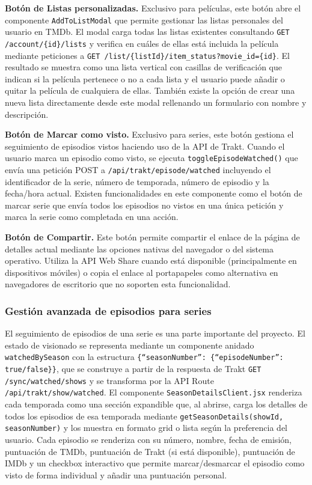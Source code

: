 \textbf{Botón de Listas personalizadas.} Exclusivo para películas, este botón abre el componente \texttt{AddToListModal} que permite gestionar las listas personales del usuario en TMDb. El modal carga todas las listas existentes consultando \texttt{GET /account/\{id\}/lists} y verifica en cuáles de ellas está incluida la película mediante peticiones a \texttt{GET /list/\{listId\}/item\_status?movie\_id=\{id\}}. El resultado se muestra como una lista vertical con casillas de verificación que indican si la película pertenece o no a cada lista y el usuario puede añadir o quitar la película de cualquiera de ellas. También existe la opción de crear una nueva lista directamente desde este modal rellenando un formulario con nombre y descripción.

\textbf{Botón de Marcar como visto.} Exclusivo para series, este botón gestiona el seguimiento de episodios vistos haciendo uso de la API de Trakt. Cuando el usuario marca un episodio como visto, se ejecuta \texttt{toggleEpisodeWatched()} que envía una petición POST a \texttt{/api/trakt/episode/watched} incluyendo el identificador de la serie, número de temporada, número de episodio y la fecha/hora actual. Existen funcionalidades en este componente como el botón de marcar serie que envía todos los episodios no vistos en una única petición y marca la serie como completada en una acción.

\textbf{Botón de Compartir.} Este botón permite compartir el enlace de la página de detalles actual mediante las opciones nativas del navegador o del sistema operativo. Utiliza la API Web Share cuando está disponible (principalmente en dispositivos móviles) o copia el enlace al portapapeles como alternativa en navegadores de escritorio que no soporten esta funcionalidad.

\subsubsection{Gestión avanzada de episodios para series}

El seguimiento de episodios de una serie es una parte importante del proyecto. El estado de visionado se representa mediante un componente anidado \texttt{watchedBySeason} con la estructura \texttt{\{``seasonNumber'': \{``episodeNumber'': true/false\}\}}, que se construye a partir de la respuesta de Trakt \texttt{GET /sync/watched/shows} y se transforma por la API Route \texttt{/api/trakt/show/watched}. El componente \texttt{SeasonDetailsClient.jsx} renderiza cada temporada como una sección expandible que, al abrirse, carga los detalles de todos los episodios de esa temporada mediante \texttt{getSeasonDetails(showId, seasonNumber)} y los muestra en formato grid o lista según la preferencia del usuario. Cada episodio se renderiza con su número, nombre, fecha de emisión, puntuación de TMDb, puntuación de Trakt (si está disponible), puntuación de IMDb y un checkbox interactivo que permite marcar/desmarcar el episodio como visto de forma individual y añadir una puntuación personal.

